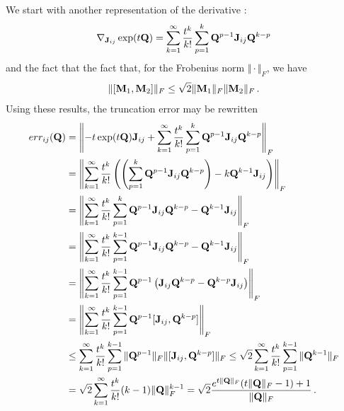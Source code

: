\documentclass[12pt]{article} %
\begin{document}
We start with another representation of the derivative \citep{al2009computing}:
\begin{align*}
	\nabla_{\mathbf{J}_{ij}} \exp(t\mathbf{Q}) = \sum_{k=1}^\infty \frac{t^k}{k!} \sum_{p=1}^k \mathbf{Q}^{p-1} \mathbf{J}_{ij} \mathbf{Q}^{k-p} 
\end{align*}
and the fact that
the fact that, for the Frobenius norm $\Vert \cdot \Vert_F$, we have \citep{wu2010short}
\begin{align*}
	\Vert [\mathbf{M}_1,\mathbf{M}_2] \Vert_F \leq \sqrt{2} \Vert \mathbf{M}_1 \Vert_F \Vert \mathbf{M}_2\Vert_F \, .
\end{align*}
Using these results, the truncation error may be rewritten
\begin{align*}
err_{ij}(\mathbf{Q})  &=\left\Vert - t\exp(t\mathbf{Q}) \mathbf{J}_{ij}  +  \sum_{k=1}^\infty \frac{t^k}{k!} \sum_{p=1}^k \mathbf{Q}^{p-1} \mathbf{J}_{ij} \mathbf{Q}^{k-p}\right\Vert_F \\
&= \left\Vert \sum_{k=1}^\infty \frac{t^k}{k!} \left( \left( \sum_{p=1}^k \mathbf{Q}^{p-1} \mathbf{J}_{ij} \mathbf{Q}^{k-p} \right) - k \mathbf{Q}^{k-1} \mathbf{J}_{ij} \right)  \right\Vert_F\\
&= \left\Vert \sum_{k=1}^\infty \frac{t^k}{k!} \sum_{p=1}^k \mathbf{Q}^{p-1} \mathbf{J}_{ij} \mathbf{Q}^{k-p}  -  \mathbf{Q}^{k-1} \mathbf{J}_{ij} \right\Vert_F \\
&=\left\Vert  \sum_{k=1}^\infty \frac{t^k}{k!} \sum_{p=1}^{k-1} \mathbf{Q}^{p-1} \mathbf{J}_{ij} \mathbf{Q}^{k-p}  -  \mathbf{Q}^{k-1} \mathbf{J}_{ij}\right\Vert_F \\
&=\left\Vert  \sum_{k=1}^\infty \frac{t^k}{k!} \sum_{p=1}^{k-1} \mathbf{Q}^{p-1}\left( \mathbf{J}_{ij} \mathbf{Q}^{k-p}  -  \mathbf{Q}^{k-p} \mathbf{J}_{ij} \right)\right\Vert_F \\
&= \left\Vert  \sum_{k=1}^\infty \frac{t^k}{k!} \sum_{p=1}^{k-1} \mathbf{Q}^{p-1}[\mathbf{J}_{ij}, \mathbf{Q}^{k-p}] \right\Vert_F  \\
&\leq  \sum_{k=1}^\infty \frac{t^k}{k!} \sum_{p=1}^{k-1} \Vert \mathbf{Q}^{p-1} \Vert_F \Vert[\mathbf{J}_{ij}, \mathbf{Q}^{k-p}]\Vert_F 
\leq \sqrt{2}  \sum_{k=1}^\infty \frac{t^k}{k!} \sum_{p=1}^{k-1} \Vert \mathbf{Q}^{k-1} \Vert_F  \\
&= \sqrt{2}  \sum_{k=1}^\infty \frac{t^k}{k!} (k-1) \Vert \mathbf{Q} \Vert_F^{k-1} = \sqrt{2} \frac{e^{t\Vert \mathbf{Q}\Vert_F}(t\Vert\mathbf{Q}\Vert_F - 1) + 1}{\Vert \mathbf{Q} \Vert_F} \, .
\end{align*}
\end{document}
